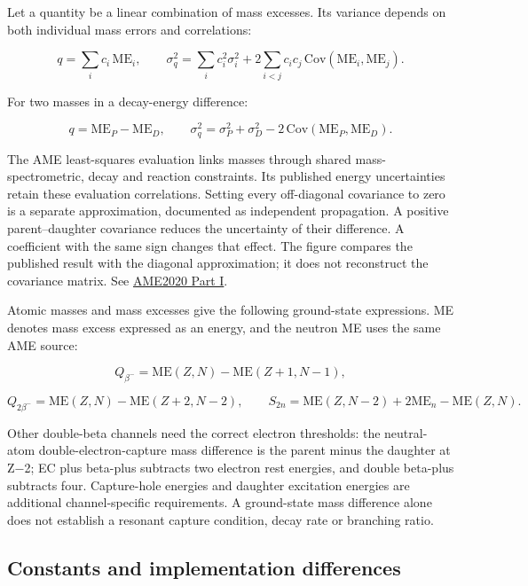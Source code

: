 \documentclass[
  11pt,
  letterpaper,
]{article}
\begin{document}
Let a quantity be a linear combination of mass excesses. Its variance
depends on both individual mass errors and correlations:

\[
q=\sum_i c_i\,\mathrm{ME}_i,\qquad
\sigma_q^2=\sum_i c_i^2\sigma_i^2+2\sum_{i<j}c_i c_j\,\mathrm{Cov}(\mathrm{ME}_i,\mathrm{ME}_j).
\]

For two masses in a decay-energy difference:

\[
q=\mathrm{ME}_P-\mathrm{ME}_D,\qquad
\sigma_q^2=\sigma_P^2+\sigma_D^2-2\,\mathrm{Cov}(\mathrm{ME}_P,\mathrm{ME}_D).
\]

The AME least-squares evaluation links masses through shared
mass-spectrometric, decay and reaction constraints. Its published energy
uncertainties retain these evaluation correlations. Setting every
off-diagonal covariance to zero is a separate approximation, documented
as independent propagation. A positive parent--daughter covariance
reduces the uncertainty of their difference. A coefficient with the same
sign changes that effect. The figure compares the published result with
the diagonal approximation; it does not reconstruct the covariance
matrix. See \href{https://doi.org/10.1088/1674-1137/abddb0}{AME2020 Part
I}.

Atomic masses and mass excesses give the following ground-state
expressions. ME denotes mass excess expressed as an energy, and the
neutron ME uses the same AME source:

\[
Q_{\beta^-}=\mathrm{ME}(Z,N)-\mathrm{ME}(Z+1,N-1),
\]

\[
Q_{2\beta^-}=\mathrm{ME}(Z,N)-\mathrm{ME}(Z+2,N-2),\qquad
S_{2n}=\mathrm{ME}(Z,N-2)+2\mathrm{ME}_n-\mathrm{ME}(Z,N).
\]

Other double-beta channels need the correct electron thresholds: the
neutral-atom double-electron-capture mass difference is the parent minus
the daughter at Z−2; EC plus beta-plus subtracts two electron rest
energies, and double beta-plus subtracts four. Capture-hole energies and
daughter excitation energies are additional channel-specific
requirements. A ground-state mass difference alone does not establish a
resonant capture condition, decay rate or branching ratio.

\subsection{Constants and implementation
differences}\label{constants-and-implementation-differences}
\end{document}
